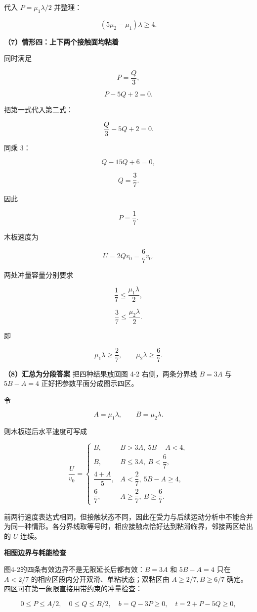 \documentclass[12pt,a4paper,UTF8]{ctexart}
\begin{document}
代入 \(P=\mu_1\lambda/2\) 并整理：

\[\boxed{(5\mu_2-\mu_1)\lambda\ge4}.\]

\textbf{（7）情形四：上下两个接触面均粘着}

同时满足

\[P=\frac Q3,\]

\[P-5Q+2=0.\]

把第一式代入第二式：

\[\frac Q3-5Q+2=0.\]

同乘 \(3\)：

\[Q-15Q+6=0,\]

\[Q=\frac37.\]

因此

\[P=\frac17.\]

木板速度为

\[\boxed{U=2Qv_0=\frac67v_0}.\]

两处冲量容量分别要求

\[\frac17\le\frac{\mu_1\lambda}{2},\]

\[\frac37\le\frac{\mu_2\lambda}{2}.\]

即

\[\boxed{
\mu_1\lambda\ge\frac27,
\qquad
\mu_2\lambda\ge\frac67
}.\]

\textbf{（8）汇总为分段答案} 把四种结果放回图 4-2 右侧，两条分界线
\(B=3A\) 与 \(5B-A=4\) 正好把参数平面分成图示四区。

令

\[A=\mu_1\lambda,
\qquad B=\mu_2\lambda.\]

则木板碰后水平速度可写成

\[\boxed{
\frac U{v_0}=
\begin{cases}
B,
&B>3A,\ 5B-A<4,\\[3pt]
B,
&B\le3A,\ B<\dfrac67,\\[6pt]
\dfrac{4+A}{5},
&A<\dfrac27,\ 5B-A\ge4,\\[8pt]
\dfrac67,
&A\ge\dfrac27,\ B\ge\dfrac67.
\end{cases}}
\]

前两行速度表达式相同，但接触状态不同，因此在受力与后续运动分析中不能合并为同一种情形。各分界线取等号时，相应接触点恰好达到粘滑临界，邻接两区给出的
\(U\) 连续。

\textbf{相图边界与耗能检查}

图4-2的四条有效边界不是无限延长后都有效：\(B=3A\) 和 \(5B-A=4\) 只在
\(A<2/7\) 的相应区段内分开双滑、单粘状态；双粘区由 \(A\ge2/7,B\ge6/7\)
确定。四区可在第一象限直接用带约束的冲量检查：

\[0\le P\le A/2,\quad0\le Q\le B/2,
\quad b=Q-3P\ge0,\quad t=2+P-5Q\ge0,\]
\end{document}
